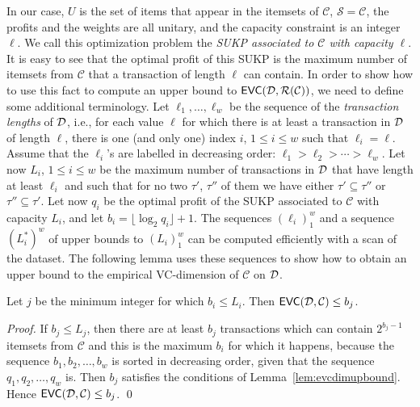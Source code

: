 In our case, $U$ is the set of items that appear in the itemsets of
$\mathcal{C}$, $\mathcal{S}=\mathcal{C}$, the profits and the weights are all
unitary, and the capacity constraint is an integer $\ell$. We call this
optimization problem the \emph{SUKP associated to $\mathcal{C}$ with capacity
$\ell$}.
It is easy to see %
that the optimal profit of this SUKP is the maximum number
of itemsets from $\mathcal{C}$ that a transaction of length $\ell$ can contain.  %
In order to show how to use this fact to compute an upper bound to
$\mathsf{EVC}({\cal D},\mathcal{R}(\mathcal{C}))$, we need to define some additional terminology. Let
$\ell_1,\dotsc,\ell_w$ be the sequence of the
\emph{transaction lengths} of ${\cal D}$, i.e., for each value $\ell$
for which there is at least a transaction in ${\cal D}$ of length $\ell$, there is
one (and only one) index $i$, $1\le i\le w$ such that $\ell_i=\ell$. Assume that
the $\ell_i$'s are labelled in decreasing order:
$\ell_1>\ell_2>\dotsb>\ell_w$. Let now $L_i$, $1\le i\le w$ be the maximum number of
transactions in ${\cal D}$ that have length at least $\ell_i$ and such that
for no two $\tau'$, $\tau''$ of them we have either $\tau'\subseteq\tau''$ or
$\tau''\subseteq\tau'$. Let now $q_i$ be the optimal profit of the SUKP associated to
$\mathcal{C}$ with capacity $L_i$, and let $b_i=\lfloor \log_2q_i\rfloor +1$.
The sequences $(\ell_i)_1^w$ and a sequence $(L_i^*)^w$ of upper bounds to
$(L_i)_1^w$ can be computed efficiently with a scan of the dataset. 
The following lemma uses these sequences to show how to obtain an upper bound to
the empirical VC-dimension of $\mathcal{C}$ on ${\cal D}$.

\begin{lemma}\label{lem:sukpevc}
  Let $j$ be the minimum integer for which $b_i\le L_i$. Then
  $\mathsf{EVC}({\cal D},\mathcal{C})\le b_j$. %
\end{lemma}
\begin{proof}
  If $b_j\le L_j$, then there are at least $b_j$ transactions which can contain
  $2^{b_j-1}$ itemsets from $\mathcal{C}$ and this is the maximum $b_i$ for
  which it happens, because the sequence $b_1,b_2,\dotsc,b_w$ is sorted in
  decreasing order, given that the sequence $q_1,q_2,\dotsc,q_w$ is. Then $b_j$
  satisfies the conditions of Lemma~\ref{lem:evcdimupbound}. Hence
  $\mathsf{EVC}({\cal D},\mathcal{C})\le b_j$.
  \qed
\end{proof}

